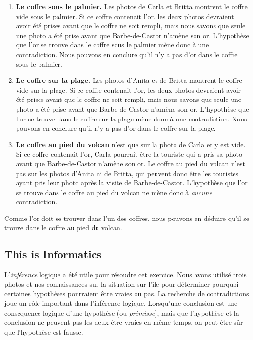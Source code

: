 \documentclass[a4paper,11pt]{report}
\begin{document}
\begin{enumerate}
  \item \textbf{Le coffre sous le palmier.}
Les photos de Carla et Britta montrent le coffre vide sous le palmier. Si ce coffre contenait l’or, les deux photos devraient avoir été prises avant que le coffre ne soit rempli, mais nous savons que seule une photo a été prise avant que Barbe-de-Castor n’amène son or. L’hypothèse que l’or se trouve dans le coffre sous le palmier mène donc à une contradiction. Nous pouvons en conclure qu’il n’y a pas d’or dans le coffre sous le palmier.
  \item \textbf{Le coffre sur la plage.}
Les photos d’Anita et de Britta montrent le coffre vide sur la plage. Si ce coffre contenait l’or, les deux photos devraient avoir été prises avant que le coffre ne soit rempli, mais nous savons que seule une photo a été prise avant que Barbe-de-Castor n’amène son or. L’hypothèse que l’or se trouve dans le coffre sur la plage mène donc à une contradiction. Nous pouvons en conclure qu’il n’y a pas d’or dans le coffre sur la plage.
  \item \textbf{Le coffre au pied du volcan} n’est que sur la photo de Carla et y est vide. Si ce coffre contenait l’or, Carla pourrait être la touriste qui a pris sa photo avant que Barbe-de-Castor n’amène son or. Le coffre au pied du volcan n’est pas sur les photos d’Anita ni de Britta, qui peuvent donc être les touristes ayant pris leur photo après la visite de Barbe-de-Castor. L’hypothèse que l’or se trouve dans le coffre au pied du volcan ne mène donc à \emph{aucune} contradiction.
\end{enumerate}

Comme l’or doit se trouver dans l’un des coffres, nous pouvons en déduire qu’il se trouve dans le coffre au pied du volcan.


\subsection*{This is Informatics}

L’\emph{inférence} logique a été utile pour résoudre cet exercice. Nous avons utilisé trois photos et nos connaissances sur la situation sur l’île pour déterminer pourquoi certaines hypothèses pourraient être vraies ou pas. La recherche de contradictions joue un rôle important dans l’inférence logique. Lorsqu’une conclusion est une conséquence logique d’une hypothèse (ou \emph{prémisse}), mais que l’hypothèse et la conclusion ne peuvent pas les deux être vraies en même temps, on peut être sûr que l’hypothèse est fausse.
\end{document}
